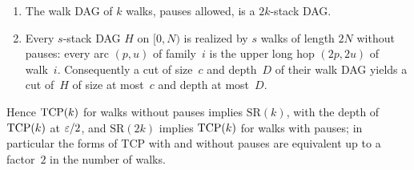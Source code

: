 \begin{proposition}\label{prop:stacks}
\begin{enumerate}[label=(\alph*)]
\item The walk DAG of $k$ walks, pauses allowed, is a $2k$-stack DAG.
\item Every $s$-stack DAG $H$ on $[0,N)$ is realized by $s$ walks of length $2N$ without pauses: every arc $(p,u)$ of
family~$i$ is the upper long hop $(2p,2u)$ of walk~$i$. Consequently a cut of size~$c$ and depth~$D$ of their walk DAG yields
a cut of~$H$ of size at most~$c$ and depth at most~$D$.
\end{enumerate}
Hence $\mathrm{TCP}(k)$ for walks without pauses implies $\mathrm{SR}(k)$, with the depth of $\mathrm{TCP}(k)$ at $\varepsilon/2$, and
$\mathrm{SR}(2k)$ implies $\mathrm{TCP}(k)$ for walks with pauses; in particular the forms of TCP with and without pauses are
equivalent up to a factor~$2$ in the number of walks.
\end{proposition}

